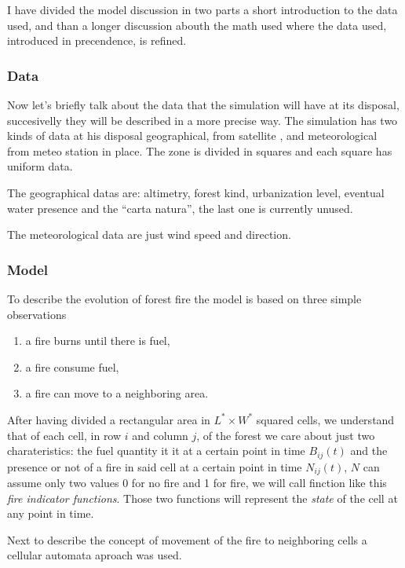 \documentclass[Lau]{sapthesis} %
\begin{document}
I have divided the model discussion in two parts a short introduction to the
data used, and than a longer discussion abouth the math used where the data
used, introduced in precendence, is refined.

\subsubsection{Data}\label{sec:data}

Now let's briefly talk about the data that the simulation will have at its
disposal, succesivelly they will be described in a more precise way. The
simulation has two kinds of data at his disposal geographical, from satellite
\cite{cop}, and meteorological from meteo station in place. The zone is divided
in squares and each square has uniform data.

The geographical datas are: altimetry, forest kind, urbanization level, eventual
water presence and the ``carta natura'', the last one is currently unused.

The meteorological data are just wind speed and direction.

\subsubsection{Model}

To describe the evolution of forest fire the model is based on three simple
observations

\begin{enumerate}
\item a fire burns until there is fuel,
\item a fire consume fuel,
\item a fire can move to a neighboring area.
\end{enumerate}

After having divided a rectangular area in $L^* \times W^*$ squared cells, we
understand that of each cell, in row $i$ and column $j$, of the forest we care
about just two charateristics: the fuel quantity it it at a certain point in
time $B_{ij}(t)$ and the presence or not of a fire in said cell at a certain
point in time $N_{ij}(t)$, $N$ can assume only two values 0 for no fire and 1
for fire, we will call finction like this \emph{fire indicator functions}. Those
two functions will represent the \emph{state} of the cell at any point in time.

Next to describe the concept of movement of the fire to neighboring cells a
cellular automata aproach was used.
\end{document}
